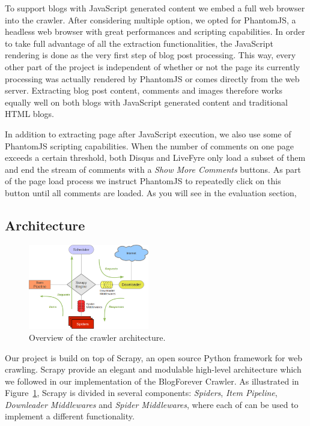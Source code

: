 %
To support blogs with JavaScript generated content we embed a full web browser into the crawler. After considering multiple option, we opted for PhantomJS\cite{phantomjs2013}, a headless web browser with great performances and scripting capabilities. In order to take full advantage of all the extraction functionalities, the JavaScript rendering is done as the very first step of blog post processing. This way, every other part of the project is independent of whether or not the page its currently processing was actually rendered by PhantomJS or comes directly from the web server. Extracting blog post content, comments and images therefore works equally well on both blogs with JavaScript generated content and traditional HTML blogs.

%
In addition to extracting page after JavaScript execution, we also use some of PhantomJS scripting capabilities. When the number of comments on one page exceeds a certain threshold, both Disqus and LiveFyre only load a subset of them and end the stream of comments with a \emph{Show More Comments} buttons. As part of the page load process we instruct PhantomJS to repeatedly click on this button until all comments are loaded. As you will see in the evaluation section, 


\subsection{Architecture}

\begin{figure}
  \centering
  \includegraphics[width=0.47\textwidth]{img/scrapy_architecture.png}
  \caption{Overview of the crawler architecture.}
  \label{architecture}
\end{figure}

Our project is build on top of Scrapy\cite{scra py2013}, an open source Python framework for web crawling. Scrapy provide an elegant and modulable high-level architecture which we followed in our implementation of the BlogForever Crawler. As illustrated in Figure~\ref{architecture}, Scrapy is divided in several components: \emph{Spiders}, \emph{Item Pipeline}, \emph{Downleader Middlewares} and \emph{Spider Middlewares}, where each of can be used to implement a different functionality.

